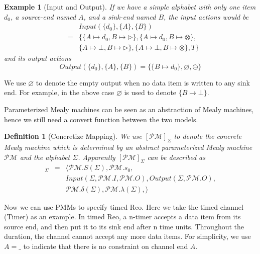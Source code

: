 \documentclass[conference, a4paper]{IEEEtran}
\newtheorem{definition}{Definition}
\newtheorem{example}{Example}
\newcommand{\rblock}[0]{\circleddash}
\newcommand{\rread}[0]{\rhd}
\newcommand{\rnoread}[0]{\otimes}
\newcommand{\smap}[1]{[{#1}]}
\begin{document}
\begin{example}[Input and Output]
  If we have a simple alphabet with only one item $d_0$, a source-end named $A$, and a
  sink-end named $B$, the input actions would be
  \begin{eqnarray*}
    & & Input(\{d_0\},\{A\},\{B\}) \\
    & = & \{\{A\mapsto d_0,B\mapsto\rread\},\{A\mapsto d_0,B\mapsto\rnoread\}, \\
    & & \{A\mapsto\bot,B\mapsto\rread\}, \{A\mapsto\bot,B\mapsto\rnoread\},T\}
  \end{eqnarray*}
  and its output actions
  \[
  Output(\{d_0\},\{A\},\{B\}) =\{\{B\mapsto d_0\},\varnothing, \rblock\}
  \]
\end{example}

We use $\varnothing$ to denote the empty output when no data item is written to any sink end.
For example, in the above case $\varnothing$ is used to denote $\{B\mapsto\bot\}$.

Parameterized Mealy machines can be seen as an abstraction of Mealy machines, hence we
still need a convert function between the two models.

\begin{definition}[Concretize Mapping]
  We use $\smap{\mathcal{PM}}_{\Sigma}$ to denote the concrete Mealy machine which is determined by
  an abstract parameterized Mealy machine $\mathcal{PM}$ and the alphabet $\Sigma$. Apparently
  $\smap{\mathcal{PM}}_{\Sigma}$ can be described as
  \begin{eqnarray*}
    \smap{\mathcal{PM}}_{\Sigma} &=& 
    \langle
    \mathcal{PM}.S(\Sigma), \mathcal{PM}.s_0, \\
    & & Input(\Sigma, \mathcal{PM}.I, \mathcal{PM}.O), Output(\Sigma, \mathcal{PM}.O), \\
    & & \mathcal{PM}.\delta(\Sigma), \mathcal{PM}.\lambda(\Sigma),
    \rangle
  \end{eqnarray*}
\end{definition}

Now we can use PMMs to specify timed Reo. Here we take the timed channel (Timer) as an example. In
timed Reo, a n-timer accepts a data item from its source end, and then put it to its sink end after
n time units. Throughout the duration, the channel cannot accept any more data items.
For simplicity, we use $A=\_$ to indicate that there is no constraint on channel end $A$.
\end{document}
